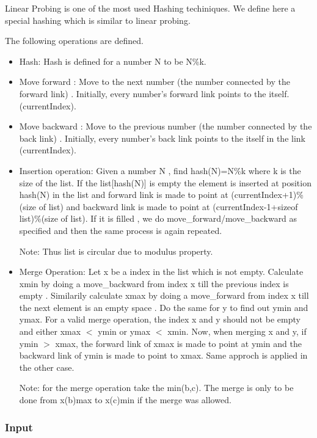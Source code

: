 



   Linear Probing is one of the most used Hashing techiniques. We define here a special hashing which is similar to linear probing.  

   The following operations are defined.  
\begin{itemize}
	\item     Hash: Hash is defined for a number N to be N\%k.   
	\item     Move forward : Move to the next number (the number connected by the forward link) . Initially, every number's forward link points to the itself. (currentIndex).   
	\item     Move backward : Move to the previous number (the number connected by the back link) . Initially, every number's back link points to the itself in the link (currentIndex).   
	\item     Insertion operation: Given a number N , find hash(N)=N\%k where k is the size of the list. If the list[hash(N)] is empty the element is inserted at position hash(N) in the list and forward link is made to point at (currentIndex+1)\%(size of list) and backward link is made to point at (currentIndex-1+sizeof list)\%(size of list). If it is filled , we do move\_forward/move\_backward as specified and then the same process is again repeated.   

    Note: Thus list is circular due to modulus property.   
	\item     Merge Operation: Let x be a index in the list which is not empty. Calculate xmin by doing a move\_backward from index x till the previous index is empty . Similarily calculate xmax by doing a move\_forward from index x till the next element is an empty space . Do the same for y to find out ymin and ymax. For a valid merge operation, the index x and y should not be empty and either xmax $<$ ymin or ymax $<$ xmin. Now, when merging x and y, if ymin $>$ xmax, the forward link of xmax is made to point at ymin and the backward link of ymin is made to point to xmax. Same approch is applied in the other case.   

    Note: for the merge operation take the min(b,c). The merge is only to be done from x(b)max to x(c)min if the merge was allowed.   
\end{itemize}

\subsubsection{   Input  }


